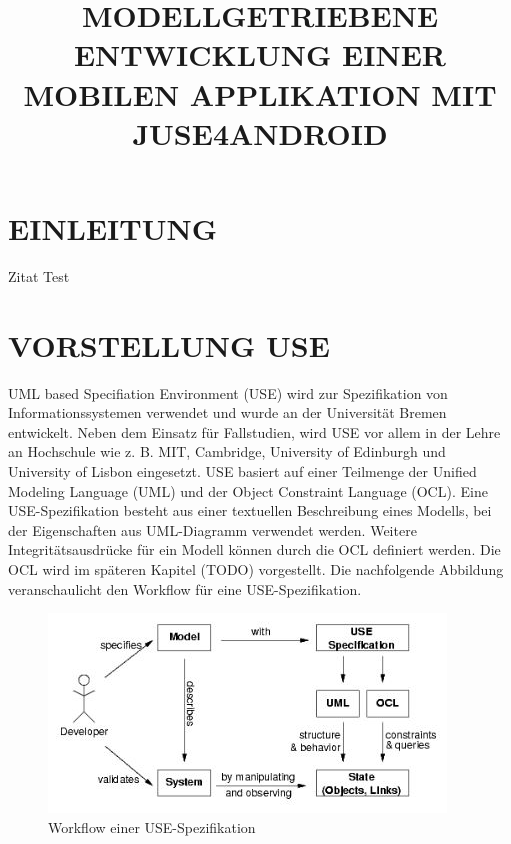 \documentclass[a4paper,twoside]{article}
\begin{document}
\title{\uppercase{Modellgetriebene Entwicklung einer mobilen Applikation mit JUSE4Android}}

\author{
}




\onecolumn \maketitle \normalsize \vfill

\section{\uppercase{Einleitung}}
\label{sec:introduction}
\noindent Zitat Test
\cite{SilvaMasterThesis}

\section{\uppercase{Vorstellung USE}}

UML based Specifiation Environment (USE) wird zur Spezifikation von Informationssystemen verwendet und wurde an der Universität Bremen entwickelt. Neben dem Einsatz für Fallstudien, wird USE vor allem in der Lehre an Hochschule wie z. B. MIT, Cambridge, University of Edinburgh und University of Lisbon eingesetzt.  USE basiert auf einer Teilmenge der Unified Modeling Language (UML) und der Object Constraint Language (OCL). Eine USE-Spezifikation besteht aus einer textuellen Beschreibung eines Modells, bei der Eigenschaften aus UML-Diagramm verwendet werden. Weitere Integritätsausdrücke für ein Modell können durch die OCL definiert werden. \cite{Use07} Die OCL wird im späteren Kapitel (TODO) vorgestellt. Die nachfolgende Abbildung veranschaulicht den Workflow für eine USE-Spezifikation.

\begin{figure}[!h]
	\includegraphics[scale=.7]{pics/USE_workflow.jpg}
	\captionsetup{labelformat=empty}
	\caption{Workflow einer USE-Spezifikation \cite{Data07}}
\end{figure}
\end{document}
